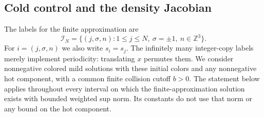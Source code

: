 \subsection{Cold control and the density Jacobian}

The labels for the finite approximation are
\[
 \mathcal I_N=\{(j,\sigma,n):1\le j\le N,\ \sigma=\pm1,\
                                  n\in\mathbb Z^3\}.
\]
For \(i=(j,\sigma,n)\) we also write \(s_i=s_j\).
The infinitely many integer-copy labels merely implement
periodicity: translating \(x\) permutes them.  We consider
nonnegative colored mild solutions with these initial colors and
any nonnegative hot component, with a common finite collision
cutoff \(b>0\).  The statement below applies throughout every
interval on which the finite-approximation solution exists with
bounded weighted sup norm.  Its constants do not use that norm or
any bound on the hot component.

